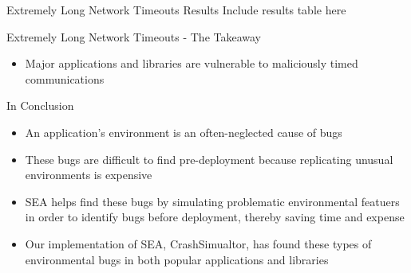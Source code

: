 \documentclass[pdf]{beamer}
\begin{document}
\begin{frame}{Extremely Long Network Timeouts Results}
  Include results table here
\end{frame}


\begin{frame}{Extremely Long Network Timeouts - The Takeaway}
  \begin{itemize}
    \item{Major applications and libraries are vulnerable to maliciously
      timed communications}
  \end{itemize}
\end{frame}


\begin{frame}{In Conclusion}
  \begin{itemize}
  \item{An application's environment is an often-neglected cause of bugs}
  \item{These bugs are difficult to find pre-deployment because replicating
      unusual environments is expensive}
  \item{SEA helps find these bugs by simulating problematic environmental
      featuers in order to identify bugs before deployment, thereby
      saving time and expense}
  \item{Our implementation of SEA, CrashSimualtor, has found these types
      of environmental bugs in both popular applications and libraries}
  \end{itemize}
\end{frame}
\end{document}
